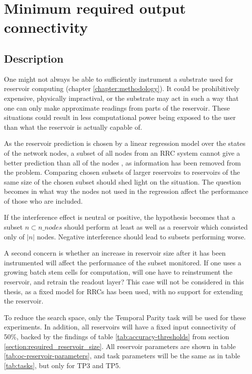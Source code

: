 \section{Minimum required output connectivity}

\subsection{Description}

One might not always be able to sufficiently instrument a substrate used for reservoir computing (chapter \ref{chapter:methodology}).
It could be prohibitively expensive, physically impractival, or the substrate may act in such a way that one can only make approximate readings from parts of the reservoir.
These situations could result in less computational power being exposed to the user than what the reservoir is actually capable of.

As the reservoir prediction is chosen by a linear regression model over the states of the network nodes,
a subset of all nodes from an RRC system cannot give a better prediction than all of the nodes \cm,
as information has been removed from the problem.
Comparing chosen subsets of larger reservoirs to reservoirs of the same size of the chosen subset should shed light on the situation.
The question becomes in what way the nodes not used in the regression affect the performance of those who are included.

If the interference effect is neutral or positive,
the hypothesis becomes that a subset $n \subset n\_nodes$ should perform at least as well as a reservoir which consisted only of $|n|$ nodes.
Negative interference should lead to subsets performing worse.

A second concern is whether an increase in reservoir size after it has been instrumented will affect the performance of the subset monitored.
If one uses a growing batch stem cells for computation,
will one have to reinstrument the reservoir, and retrain the readout layer?
This case will not be considered in this thesis, as a fixed model for RRCs has been used, with no support for extending the reservoir.

To reduce the search space, only the Temporal Parity task will be used for these experiments.
In addition, all reservoirs will have a fixed input connectivity of 50\%,
backed by the findings of table \ref{tab:accuracy-thresholds} from section \ref{section:required_reservoir_size}.
All reservoir parameters are shown in table \ref{tab:oc-reservoir-parameters},
and task parameters will be the same as in table \ref{tab:tasks},
but only for TP3 and TP5.

